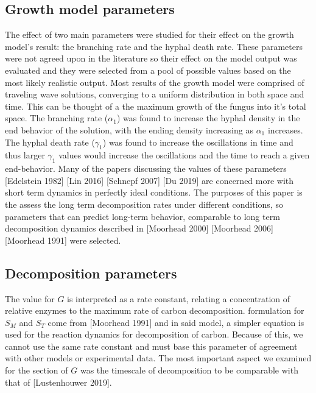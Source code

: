 \documentclass[10pt]{article}
\begin{document}
\subsection*{Growth model parameters}
The effect of two main parameters were studied for their effect on the growth model's result: the branching rate and the hyphal death rate. These parameters were not agreed upon in the literature so their effect on the model output was evaluated and they were selected from a pool of possible values based on the most likely realistic output. Most results of the growth model were comprised of traveling wave solutions, converging to a uniform distribution in both space and time. This can be thought of a the maximum growth of the fungus into it's total space. The branching rate ($\alpha_{1}$) was found to increase the hyphal density in the end behavior of the solution, with the ending density increasing as $\alpha_{1}$ increases. The hyphal death rate ($\gamma_{1}$) was found to increase the oscillations in time and thus larger $\gamma_{1}$ values would increase the oscillations and the time to reach a given end-behavior. Many of the papers discussing the values of these parameters [Edelstein 1982] [Lin 2016] [Schnepf 2007] [Du 2019] are concerned more with short term dynamics in perfectly ideal conditions. The purposes of this paper is the assess the long term decomposition rates under different conditions, so parameters that can predict long-term behavior, comparable to long term decomposition dynamics described in [Moorhead 2000] [Moorhead 2006] [Moorhead 1991] were selected.
\subsection*{Decomposition parameters}
The value for $G$ is interpreted as a rate constant, relating a concentration of relative enzymes to the maximum rate of carbon decomposition. formulation for $S_{M}$ and $S_{T}$ come from [Moorhead 1991] and in said model, a simpler equation is used for the reaction dynamics for decomposition of carbon. Because of this, we cannot use the same rate constant and must base this parameter of agreement with other models or experimental data. The most important aspect we examined for the section of $G$ was the timescale of decomposition to be comparable with that of [Lustenhouwer 2019].
\end{document}
